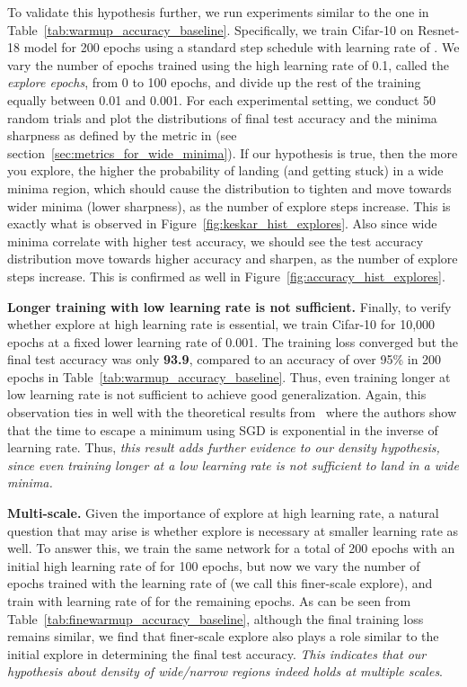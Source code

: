 \documentclass[twoside,11pt]{article}
\begin{document}
To validate this hypothesis further, we run experiments similar to the one in Table~\ref{tab:warmup_accuracy_baseline}. Specifically, we train Cifar-10 on Resnet-18 model for 200 epochs using a standard step schedule with learning rate of . We vary the number of epochs trained using the high learning rate of 0.1, called the {\it explore epochs}, from 0 to 100 epochs, and divide up the rest of the training equally between 0.01 and 0.001. For each experimental setting, we conduct 50 random trials and plot the distributions of final test accuracy and the minima sharpness as defined by the metric in \cite{keskar2016large} (see section~\ref{sec:metrics_for_wide_minima}). If our hypothesis is true, then the more you explore, the higher the probability of landing (and getting stuck) in a wide minima region, which should cause the distribution to tighten and move towards wider minima (lower sharpness), as the number of explore steps increase. This is exactly what is observed in Figure~\ref{fig:keskar_hist_explores}. Also since wide minima correlate with higher test accuracy, we should see the test accuracy distribution move towards higher accuracy and sharpen, as the number of explore steps increase. This is confirmed as well in Figure~\ref{fig:accuracy_hist_explores}.

\noindent
{\bf Longer training with low learning rate is not sufficient.}
Finally, to verify whether explore at high learning rate is essential, we train Cifar-10 for 10,000 epochs at a fixed lower learning rate of 0.001. The training loss converged but the final test accuracy was only \textbf{93.9}, compared to an accuracy of over 95\% in 200 epochs in Table~\ref{tab:warmup_accuracy_baseline}. Thus, even training  longer at low learning rate is not sufficient to achieve good generalization. Again, this observation ties in well with the theoretical results from~\citet{xie2020diffusion} where the authors show that the time to escape a minimum using SGD is exponential in the inverse of learning rate. Thus, {\it this result adds further evidence to our density hypothesis, since even training  longer at a low
learning rate is not sufficient to land in a wide minima.}


\vspace{6pt}

\noindent
{\bf Multi-scale.} Given the importance of explore at high learning rate, a natural question that may arise is whether explore is necessary at smaller learning rate as well. To answer this, we train the same network for a total of 200 epochs with an initial high learning rate of  for 100 epochs, but now we vary the number of epochs trained with the learning rate of  (we call this finer-scale explore), and train with learning rate of  for the remaining epochs. As can be seen from Table~\ref{tab:finewarmup_accuracy_baseline}, although the final training loss remains similar, we find that finer-scale explore also plays a role similar to the initial explore in determining the final test accuracy. {\it This indicates that our hypothesis about density of wide/narrow regions indeed holds at multiple scales}.
\end{document}
